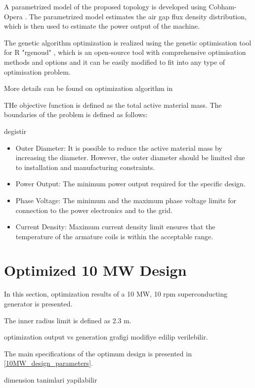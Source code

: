 \documentclass[final,peerreview,onecolumn]{IEEEtran}
\begin{document}
A parametrized model of the proposed topology is developed using Cobham-Opera \cite{Opera}. The parametrized model estimates the air gap flux density distribution, which is then used to estimate the power output of the machine.

The genetic algorithm optimization is realized using the genetic optimisation tool for R "rgenoud" \cite{Mebane2011}, which is an open-source tool with comprehensive optimisation methods and options and it can be easily modified to fit into any type of optimisation problem.


More details can be found on optimization algorithm in \cite{github-repo}


THe objective function is defined as the total active material mass. The boundaries of the problem is defined as follows:

degistir

\begin{itemize}
  \item  Outer Diameter: It is possible to reduce the active material mass by increasing the diameter. However, the outer diameter should be limited due to installation and manufacturing constraints.
  \item Power Output: The minimum power output required for the specific design.
  \item Phase Voltage: The minimum and the maximum phase voltage limits for connection to the power electronics and to the grid.
  \item Current Density: Maximum current density limit ensures that the temperature of the armature coils is within the acceptable range.
\end{itemize}


\section{Optimized 10 MW Design}

In this section, optimization results of a 10 MW, 10 rpm superconducting generator is presented. 

The inner radius limit is defined as 2.3 m. 

optimization output vs generation grafigi modifiye edilip verilebilir.

The main specifications of the optimum design is presented in \autoref{10MW_design_parameters}.

dimension tanimlari yapilabilir
\end{document}
